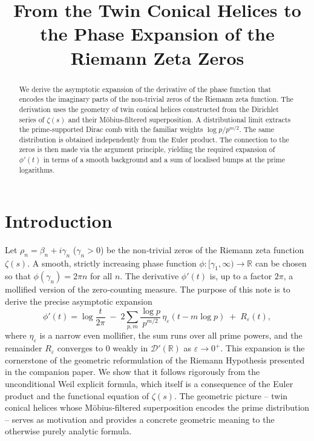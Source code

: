 \documentclass[12pt,a4paper]{article}
\title{\bf From the Twin Conical Helices to the Phase Expansion of the Riemann Zeta Zeros}
\author{}
\date{}
\newcommand{\R}{\mathbb{R}}
\newcommand{\dist}{\mathcal{D}'}
\begin{document}
\maketitle

\begin{abstract}
We derive the asymptotic expansion of the derivative of the phase function that encodes the imaginary parts of the non‑trivial zeros of the Riemann zeta function.  The derivation uses the geometry of twin conical helices constructed from the Dirichlet series of $\zeta(s)$ and their M\"obius‑filtered superposition.  A distributional limit extracts the prime‑supported Dirac comb with the familiar weights $\log p/p^{m/2}$.  The same distribution is obtained independently from the Euler product.  The connection to the zeros is then made via the argument principle, yielding the required expansion of $\phi'(t)$ in terms of a smooth background and a sum of localised bumps at the prime logarithms.
\end{abstract}

\section{Introduction}
Let $\rho_n = \beta_n + i\gamma_n$ ($\gamma_n>0$) be the non‑trivial zeros of the Riemann zeta function $\zeta(s)$.  A smooth, strictly increasing phase function $\phi:[\gamma_1,\infty)\to\R$ can be chosen so that $\phi(\gamma_n)=2\pi n$ for all $n$.  The derivative $\phi'(t)$ is, up to a factor $2\pi$, a mollified version of the zero‑counting measure.  The purpose of this note is to derive the precise asymptotic expansion
\begin{equation}\label{goal}
\phi'(t) = \log\frac{t}{2\pi} \;-\; 2\sum_{p,m}\frac{\log p}{p^{m/2}}\,\eta_\varepsilon(t-m\log p) \;+\; R_\varepsilon(t),
\end{equation}
where $\eta_\varepsilon$ is a narrow even mollifier, the sum runs over all prime powers, and the remainder $R_\varepsilon$ converges to $0$ weakly in $\dist(\R)$ as $\varepsilon\to0^+$.  This expansion is the cornerstone of the geometric reformulation of the Riemann Hypothesis presented in the companion paper.  We show that it follows rigorously from the unconditional Weil explicit formula, which itself is a consequence of the Euler product and the functional equation of $\zeta(s)$.  The geometric picture – twin conical helices whose M\"obius‑filtered superposition encodes the prime distribution – serves as motivation and provides a concrete geometric meaning to the otherwise purely analytic formula.
\end{document}
